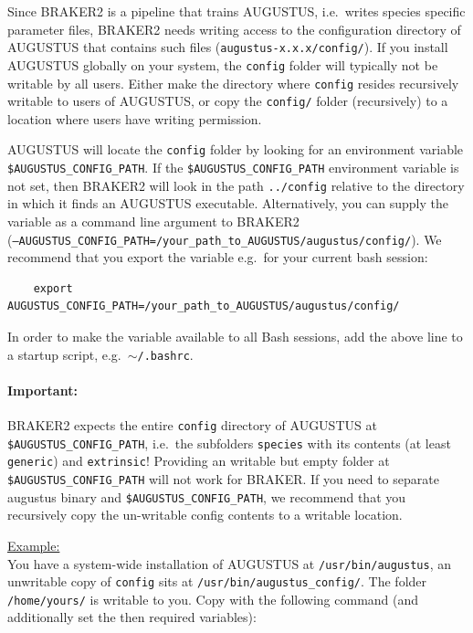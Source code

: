 \documentclass[a4paper,10pt]{report}
\begin{document}
   Since BRAKER2 is a pipeline that trains AUGUSTUS, i.e.~writes species specific parameter files, BRAKER2 needs writing access to the configuration directory of AUGUSTUS that contains such files  (\texttt{augustus-x.x.x/config/}). If you install AUGUSTUS
   globally on your system, the \texttt{config} folder will typically not be writable by all users. Either make the directory where \texttt{config} resides recursively writable to users of AUGUSTUS, or copy the \texttt{config/} folder (recursively) to a location where users have writing permission. 
   
   AUGUSTUS will locate the \texttt{config} folder by looking for an environment variable \texttt{\$AUGUSTUS\_CONFIG\_PATH}. If the \texttt{\$AUGUSTUS\_CONFIG\_PATH} environment variable is not set, then BRAKER2 will look in 
    the path \texttt{../config} relative to the directory in which it finds an AUGUSTUS executable. Alternatively, you can supply the variable as a command line argument to BRAKER2\\ (\texttt{--AUGUSTUS\_CONFIG\_PATH=/your\_path\_to\_AUGUSTUS/augustus/config/}). We recommend that you export the variable e.g.~for your current bash session:

    \begin{verbatim}
    export AUGUSTUS_CONFIG_PATH=/your_path_to_AUGUSTUS/augustus/config/
    \end{verbatim}

In order to make the variable available to all Bash sessions, add the above line to a startup script, e.g.~\texttt{$\sim$/.bashrc}.

\paragraph{Important: } BRAKER2 expects the entire \texttt{config} directory of AUGUSTUS at \texttt{\$AUGUSTUS\_CONFIG\_PATH}, i.e.~the subfolders \texttt{species} with its contents (at least \texttt{generic}) and \texttt{extrinsic}! Providing an writable but empty folder at \texttt{\$AUGUSTUS\_CONFIG\_PATH} will not work for BRAKER. If you need to separate augustus binary and \texttt{\$AUGUSTUS\_CONFIG\_PATH}, we recommend that you recursively copy the un-writable config contents to a writable location.

\noindent \underline{Example:}\\

You have a system-wide installation of AUGUSTUS at \texttt{/usr/bin/augustus}, an unwritable copy of \texttt{config} sits at \texttt{/usr/bin/augustus\_config/}. The folder \texttt{/home/yours/} is writable to you. Copy with the following command (and additionally set the then required variables):\\
\end{document}
